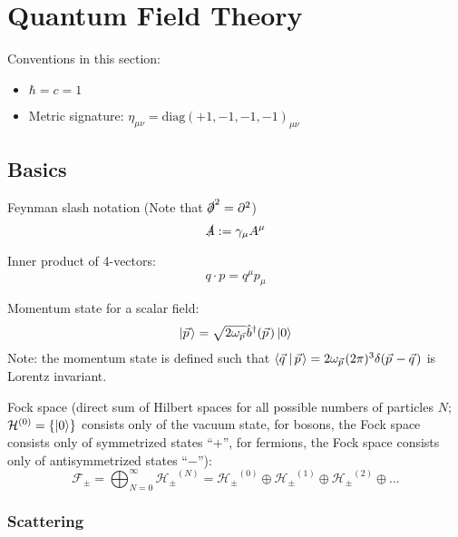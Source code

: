 \section{Quantum Field Theory} %

Conventions in this section:
\begin{itemize}
	\item $\hbar = c = 1$
	\item Metric signature: $\eta_{\mu\nu} = \mathrm{diag}(+1,-1,-1,-1)_{\mu\nu}$
\end{itemize}


\subsection{Basics}
		\noindent
		Feynman slash notation (Note that $\slashed{\partial}^2 = \partial^2$)
		\begin{equation}
			\slashed{A} := \gamma_\mu A^\mu
		\end{equation}

		\noindent
		Inner product of 4-vectors:
		\begin{equation}
			q \cdot p = q^\mu p_\mu
		\end{equation}

		\noindent
		Momentum state for a scalar field:
		\begin{equation}
			\Ket{\vec{p}} = \sqrt{2 \omega_{\vec{p}}} \hat{b}^\dagger(\vec{p}) \Ket{0}
		\end{equation}
		Note: the momentum state is defined such that $\Braket{\vec{q}|\vec{p}} = 2\omega_{\vec{p}} (2\pi)^3 \delta(\vec{p}-\vec{q})$ is Lorentz invariant.

		\noindent
		Fock space (direct sum of Hilbert spaces for all possible numbers of particles $N$; $\mathcal{H}^{(0)} = \qty{\Ket{0}}$ consists only of the vacuum state, for bosons, the Fock space consists only of symmetrized states ``$+$'', for fermions, the Fock space consists only of antisymmetrized states ``$-$''):
		\begin{equation}
			\mathcal{F_\pm}
			= \bigoplus_{N=0}^{\infty} \mathcal{H_\pm}^{(N)}
			= \mathcal{H_\pm}^{(0)} \oplus \mathcal{H_\pm}^{(1)} \oplus \mathcal{H_\pm}^{(2)} \oplus ...
		\end{equation}

		\subsubsection{Scattering}
